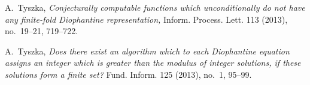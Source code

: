 \documentclass[conference]{IEEEtran}
\begin{document}
\begin{thebibliography}{11}
\mbox{A. Tyszka},
\newblock
{\em Conjecturally computable functions which unconditionally
do not have any \mbox{finite-fold} Diophantine representation,}
\newblock
Inform. Process. Lett. 113 (2013), \mbox{no. 19--21}, \mbox{719--722}.

\mbox{A. Tyszka},
\newblock
{\em Does there exist an algorithm which to each Diophantine equation
assigns an integer which is greater than the modulus of integer solutions,
if these solutions form a finite set?}
\newblock
Fund. Inform. 125 (2013), \mbox{no. 1}, \mbox{95--99}.

\end{thebibliography}
\end{document}
